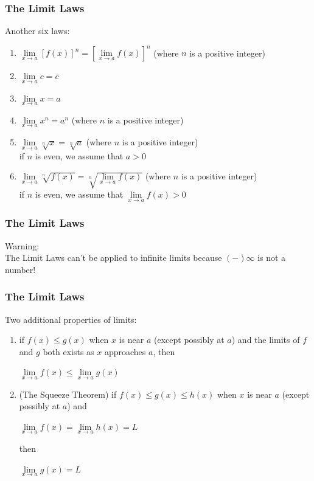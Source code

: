 	\begin{frame}
		\frametitle{The Limit Laws}
		Another six laws:
		\begin{enumerate}
			\item $\lim\limits_{\textit{x} \to a}[f(x)]^{n} = [\lim\limits_{\textit{x} \to a}f(x)]^{n}$ (where $n$ is a positive integer)
			\item $\lim\limits_{\textit{x} \to a}c = c$
			\item $\lim\limits_{\textit{x} \to a}x = a$
			\item $\lim\limits_{\textit{x} \to a}x^{n} = a^{n}$ (where $n$ is a positive integer)
			\item $\lim\limits_{\textit{x} \to a}\sqrt[n]{x} = \sqrt[n]{a}$ (where $n$ is a positive integer)\\
				\alert{if $n$ is even, we assume that $a > 0$}
			\item $\lim\limits_{\textit{x} \to a}\sqrt[n]{f(x)} = \sqrt[n]{\lim\limits_{\textit{x} \to a}f(x)}$ (where $n$ is a positive integer)\\
				\alert{if $n$ is even, we assume that $\lim\limits_{\textit{x} \to a}f(x) > 0$}
		\end{enumerate} 
	\end{frame}
	\begin{frame}
		\frametitle{The Limit Laws}
		\alert{Warning:}\\
		The Limit Laws can't be applied to infinite limits because $(-)\infty$ is not a number!
	\end{frame}
	\begin{frame}
		\frametitle{The Limit Laws}
		Two additional properties of limits:
		\begin{enumerate}
				\item if $f(x) \leq g(x)$ when $x$ is near $a$ (\alert{except possibly} at $a$) and the limits of $f$ and $g$ both exists as $x$ approaches $a$, then
					\begin{center}
						$\lim\limits_{\textit{x} \to a}f(x) \leq \lim\limits_{\textit{x} \to a}g(x)$
					\end{center}
				\item \alert{(The Squeeze Theorem)} if $f(x) \leq g(x) \leq h(x)$ when $x$ is near $a$ (\alert{except possibly} at $a$) and
					\begin{center}
						$\lim\limits_{\textit{x} \to a}f(x) = \lim\limits_{\textit{x} \to a}h(x) = L$
					\end{center}
					then
					\begin{center}
						$\lim\limits_{\textit{x} \to a}g(x) = L$
					\end{center}
		\end{enumerate}
	\end{frame}

